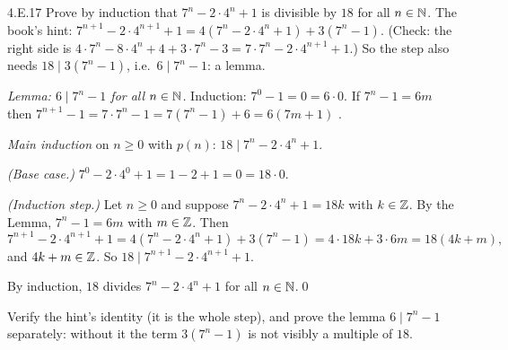 \begin{bookex}[essential]{4.E.17}
Prove by induction that $7^n-2\cdot4^n+1$ is divisible by $18$ for all $n\in\mathbb{N}$.
\solution
\given The book's hint: $7^{n+1}-2\cdot4^{n+1}+1=4(7^n-2\cdot4^n+1)+3(7^n-1)$. (Check: the right side is $4\cdot7^n-8\cdot4^n+4+3\cdot7^n-3=7\cdot7^n-2\cdot4^{n+1}+1$.) So the step also needs $18\mid3(7^n-1)$, i.e.\ $6\mid7^n-1$: a lemma.
\begin{steps}
\item \emph{Lemma: $6\mid7^n-1$ for all $n\in\mathbb{N}$.} Induction: $7^0-1=0=6\cdot0$. If $7^n-1=6m$ then $7^{n+1}-1=7\cdot7^n-1=7(7^n-1)+6=6(7m+1)$ .
\item \emph{Main induction} on $n\ge0$ with $p(n)$: $18\mid7^n-2\cdot4^n+1$.
\item \emph{(Base case.)} $7^0-2\cdot4^0+1=1-2+1=0=18\cdot0$.
\item \emph{(Induction step.)} Let $n\ge0$ and suppose $7^n-2\cdot4^n+1=18k$ with $k\in\mathbb{Z}$. By the Lemma, $7^n-1=6m$ with $m\in\mathbb{Z}$. Then
\[
7^{n+1}-2\cdot4^{n+1}+1=4(7^n-2\cdot4^n+1)+3(7^n-1)=4\cdot18k+3\cdot6m=18(4k+m),
\]
and $4k+m\in\mathbb{Z}$. So $18\mid7^{n+1}-2\cdot4^{n+1}+1$.
\end{steps}
\conclusion By induction, $18$ divides $7^n-2\cdot4^n+1$ for all $n\in\mathbb{N}$.\qed
\begin{compare}
\item Verify the hint's identity (it is the whole step), and prove the lemma $6\mid7^n-1$ separately: without it the term $3(7^n-1)$ is not visibly a multiple of $18$.
\end{compare}
\end{bookex}

